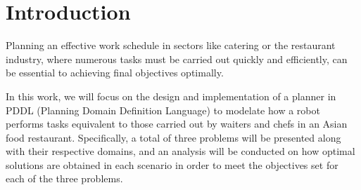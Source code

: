 \section{Introduction}

Planning an effective work schedule in sectors like catering or the restaurant industry, where numerous tasks must be carried out quickly and efficiently, can be essential to achieving final objectives optimally.

In this work, we will focus on the design and implementation of a planner in PDDL (Planning Domain Definition Language) to modelate how a robot performs tasks equivalent to those carried out by waiters and chefs in an Asian food restaurant. Specifically, a total of three problems will be presented along with their respective domains, and an analysis will be conducted on how optimal solutions are obtained in each scenario in order to meet the objectives set for each of the three problems.
